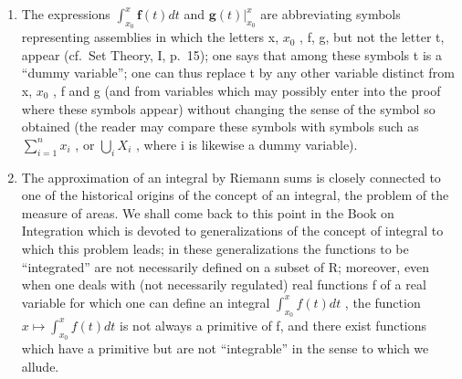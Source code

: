 \begin{enumerate}
\def\labelenumi{\arabic{enumi})}
\setcounter{enumi}{2}
\item
  The expressions \(\int_{x_{0}}^{x}\mathbf{f}(t)dt\) and \(\mathbf{g}(t)\bigg|_{x_{0}}^{x}\) are abbreviating symbols representing assemblies in which the letters x, \(x_{0}\) , f, g, but not the letter t, appear (cf.~Set Theory, I, p.~15); one says that among these symbols t is a ``dummy variable''; one can thus replace t by any other variable distinct from x, \(x_{0}\) , f and g (and from variables which may possibly enter into the proof where these symbols appear) without changing the sense of the symbol so obtained (the reader may compare these symbols with symbols such as \(\sum_{i=1}^{n}x_{i}\) , or \(\bigcup_{i}X_{i}\) , where i is likewise a dummy variable).
\item
  The approximation of an integral by Riemann sums is closely connected to one of the historical origins of the concept of an integral, the problem of the measure of areas. We shall come back to this point in the Book on Integration which is devoted to generalizations of the concept of integral to which this problem leads; in these generalizations the functions to be ``integrated'' are not necessarily defined on a subset of R; moreover, even when one deals with (not necessarily regulated) real functions f of a real variable for which one can define an integral \(\int_{x_{0}}^{x}f(t)dt\) , the function \(x\mapsto\int_{x_{0}}^{x}f(t)dt\) is not always a primitive of f, and there exist functions which have a primitive but are not ``integrable'' in the sense to which we allude.
\end{enumerate}
\relax{}
